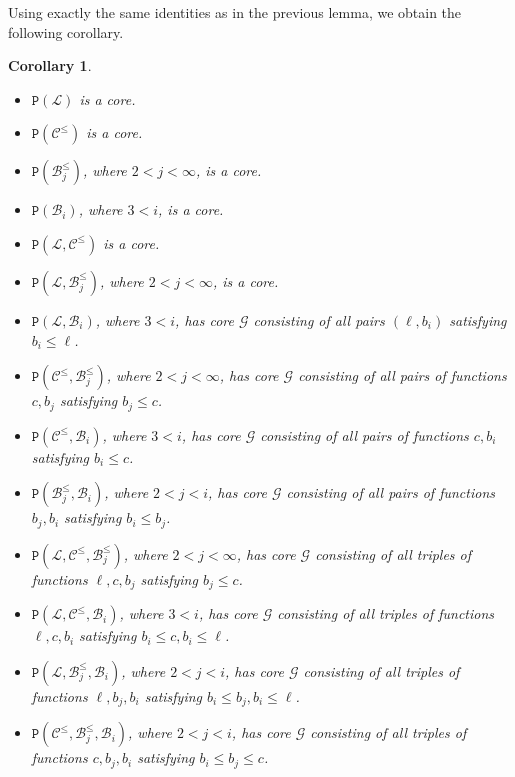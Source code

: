 \documentclass{amsart}
\numberwithin{equation}{section}
\theoremstyle{plain}
\newtheorem{corollary}[theorem]{Corollary}
\theoremstyle{definition}
\def\clone#1{\mathcal{#1}}
\def\minion#1{\mathcal{#1}}
\def\Bc{\clone{B}}
\def\Lc{\clone{L}}
\def\Cc{\clone{C}}
\def\C#1{{\mathtt{P}}(#1)}
\begin{document}
    Using exactly the same identities as in the previous lemma, we obtain the following corollary.

    \begin{corollary}
      \label{lcleqbjbicor}
\hfill
    \begin{itemize}
        \item $\C{\Lc}$ is a core.
        \item $\C{\Cc^\leq}$ is a core.
        \item $\C{\Bc_j^\leq}$, where $2<j<\infty$, is a core.
        \item $\C{\Bc_i}$, where $3<i$, is a core.
        \item $\C{\Lc,\Cc^\leq}$ is a core.
        \item $\C{\Lc,\Bc_j^\leq}$, where $2<j<\infty$, is a core.
        \item $\C{\Lc, \Bc_i}$, where $3<i$, has core $\minion{G}$ consisting of all pairs $(\ell,b_i)$  satisfying $b_i\leq \ell$. 
        \item $\C{\Cc^\leq,\Bc_j^\leq}$, where $2<j<\infty$, has core $\minion{G}$ consisting of all pairs of functions $c, b_j$ satisfying $b_j\leq c$.
        \item $\C{\Cc^\leq, \Bc_i}$, where $3<i$, has core $\minion{G}$ consisting of all pairs of functions $c, b_i$ satisfying $b_i\leq c$.
        \item $\C{\Bc_j^\leq, \Bc_i}$, where $2<j<i$, has core $\minion{G}$ consisting of all pairs of functions $b_j, b_i$ satisfying $b_i\leq b_j$.
        \item $\C{\Lc,\Cc^\leq,\Bc_j^\leq}$, where $2<j<\infty$, has core $\minion{G}$ consisting of all triples of functions $\ell,c, b_j$ satisfying $b_j\leq c$.
        \item $\C{\Lc,\Cc^\leq,\Bc_i}$, where $3<i$, has core $\minion{G}$ consisting of all triples of functions $\ell,c, b_i$ satisfying $b_i\leq c, b_i\leq \ell$.
        \item $\C{\Lc,\Bc_j^\leq,\Bc_i}$, where $2<j<i$, has core $\minion{G}$ consisting of all triples of functions $\ell,b_j, b_i$ satisfying $b_i\leq b_j, b_i\leq \ell$.
        \item $\C{\Cc^\leq, \Bc_j^\leq,\Bc_i}$, where $2<j<i$, has core $\minion{G}$ consisting of all triples of functions $c,b_j, b_i$ satisfying $b_i\leq b_j\leq c$.
    \end{itemize}
\end{corollary}
\end{document}
